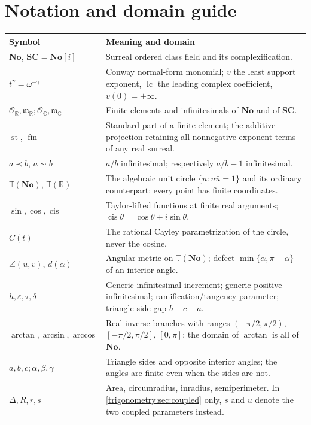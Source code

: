 \documentclass[11pt,letterpaper]{article}
\numberwithin{equation}{section}
\theoremstyle{definition}
\theoremstyle{remark}
\newcommand{\No}{\mathbf{No}}
\newcommand{\SC}{\mathbf{SC}}
\newcommand{\R}{\mathbb R}
\newcommand{\C}{\mathbb C}
\newcommand{\OO}{\mathcal O}
\newcommand{\mm}{\mathfrak m}
\newcommand{\TT}{\mathbb T}
\newcommand{\eps}{\varepsilon}
\newcommand{\st}{\operatorname{st}}
\newcommand{\fin}{\operatorname{fin}}
\newcommand{\lc}{\operatorname{lc}}
\newcommand{\cis}{\operatorname{cis}}
\newcommand{\ang}[2]{\angle(#1,#2)}
\begin{document}
\section{Notation and domain guide}\label{trigonometry:app:notation}
\begin{center}\small
\begin{longtable}{@{}L{0.26\textwidth}L{0.67\textwidth}@{}}
\toprule
Symbol & Meaning and domain\\
\midrule\endhead
$\No$, $\SC=\No[i]$ & Surreal ordered class field and its complexification.\\[0.25em]
$t^\gamma=\omega^{-\gamma}$ & Conway normal-form monomial; $v$ the least support exponent, $\lc$ the leading complex coefficient, $v(0)=+\infty$.\\[0.25em]
$\OO_{\R},\mm_{\R};\OO_{\C},\mm_{\C}$ & Finite elements and infinitesimals of $\No$ and of $\SC$.\\[0.25em]
$\st$, $\fin$ & Standard part of a finite element; the additive projection retaining all nonnegative-exponent terms of any real surreal.\\[0.25em]
$a\prec b$, $a\sim b$ & $a/b$ infinitesimal; respectively $a/b-1$ infinitesimal.\\[0.25em]
$\TT(\No)$, $\TT(\R)$ & The algebraic unit circle $\{u:u\bar u=1\}$ and its ordinary counterpart; every point has finite coordinates.\\[0.25em]
$\sin,\cos,\cis$ & Taylor-lifted functions at finite real arguments; $\cis\theta=\cos\theta+i\sin\theta$.\\[0.25em]
$C(t)$ & The rational Cayley parametrization of the circle, never the cosine.\\[0.25em]
$\ang uv$, $d(\alpha)$ & Angular metric on $\TT(\No)$; defect $\min\{\alpha,\pi-\alpha\}$ of an interior angle.\\[0.25em]
$h,\eps,\tau,\delta$ & Generic infinitesimal increment; generic positive infinitesimal; ramification/tangency parameter; triangle side gap $b+c-a$.\\[0.25em]
$\arctan,\arcsin,\arccos$ & Real inverse branches with ranges $(-\pi/2,\pi/2)$, $[-\pi/2,\pi/2]$, $[0,\pi]$; the domain of $\arctan$ is all of $\No$.\\[0.25em]
$a,b,c;\alpha,\beta,\gamma$ & Triangle sides and opposite interior angles; the angles are finite even when the sides are not.\\[0.25em]
$\Delta,R,r,s$ & Area, circumradius, inradius, semiperimeter. In \cref{trigonometry:sec:coupled} only, $s$ and $u$ denote the two coupled parameters instead.\\[0.25em]

\end{longtable}
\end{center}
\end{document}
